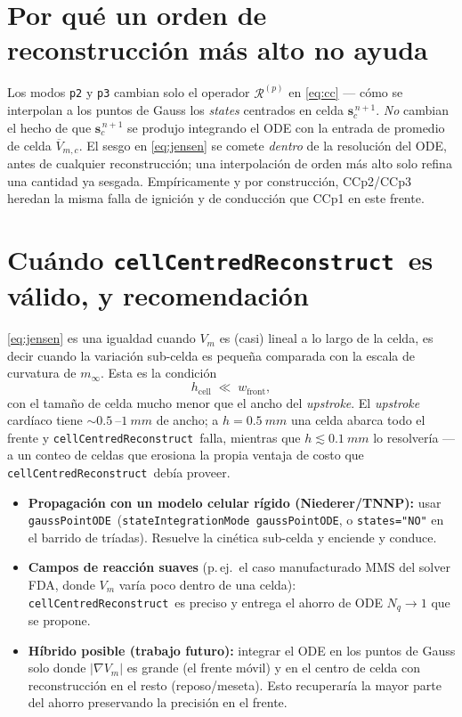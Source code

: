 \documentclass[11pt,a4paper]{article}
\newcommand{\Vm}{V_{m}}
\newcommand{\grad}{\nabla}
\newcommand{\code}[1]{\texttt{\small #1}}
\newcommand{\gpode}{\code{gaussPointODE}}
\newcommand{\ccrec}{\code{cellCentredReconstruct}}
\newcommand{\states}{\mathbf{s}}
\newcommand{\Vbarc}{\overline{V}_{m,c}}
\begin{document}
\section{Por qué un orden de reconstrucción más alto no ayuda}

Los modos \code{p2} y \code{p3} cambian solo el operador $\mathcal{R}^{(p)}$ en
\eqref{eq:cc} --- cómo se interpolan a los puntos de Gauss los \emph{states}
centrados en celda $\states_c^{\,n+1}$. \emph{No} cambian el hecho de que
$\states_c^{\,n+1}$ se produjo integrando el ODE con la entrada de promedio de
celda $\Vbarc$. El sesgo en \eqref{eq:jensen} se comete \emph{dentro} de la
resolución del ODE, antes de cualquier reconstrucción; una interpolación de orden
más alto solo refina una cantidad ya sesgada. Empíricamente y por construcción,
CCp2/CCp3 heredan la misma falla de ignición y de conducción que CCp1 en este
frente.

\section{Cuándo \ccrec\ es válido, y recomendación}

\eqref{eq:jensen} es una igualdad cuando $\Vm$ es (casi) lineal a lo largo de la
celda, es decir cuando la variación sub-celda es pequeña comparada con la escala de
curvatura de $m_\infty$. Esta es la condición
\begin{equation}
  h_{\text{cell}} \;\ll\; w_{\text{front}},
\end{equation}
con el tamaño de celda mucho menor que el ancho del \emph{upstroke}. El
\emph{upstroke} cardíaco tiene ${\sim}\SI{0.5}{}$--$\SI{1}{mm}$ de ancho; a
$h=\SI{0.5}{mm}$ una celda abarca todo el frente y \ccrec\ falla, mientras que
$h\lesssim\SI{0.1}{mm}$ lo resolvería --- a un conteo de celdas que erosiona la
propia ventaja de costo que \ccrec\ debía proveer.

\begin{itemize}[leftmargin=1.4em,nosep]
  \item \textbf{Propagación con un modelo celular rígido (Niederer/TNNP):} usar
    \gpode\ (\code{stateIntegrationMode gaussPointODE}, o \code{states="NO"} en el
    barrido de tríadas). Resuelve la cinética sub-celda y enciende y conduce.
  \item \textbf{Campos de reacción suaves} (p.\,ej.\ el caso manufacturado MMS del
    solver FDA, donde $\Vm$ varía poco dentro de una celda): \ccrec\ es preciso y
    entrega el ahorro de ODE $N_q\!\to\!1$ que se propone.
  \item \textbf{Híbrido posible (trabajo futuro):} integrar el ODE en los puntos de
    Gauss solo donde $\lvert\grad\Vm\rvert$ es grande (el frente móvil) y en el
    centro de celda con reconstrucción en el resto (reposo/meseta). Esto
    recuperaría la mayor parte del ahorro preservando la precisión en el frente.
\end{itemize}
\end{document}
